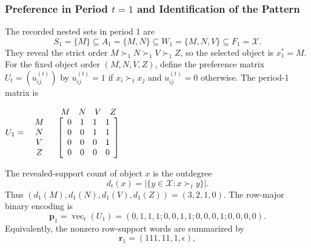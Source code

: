 \documentclass[conference]{IEEEtran}
\theoremstyle{plain}
\theoremstyle{definition}
\theoremstyle{remark}
\begin{document}
	\subsubsection{Preference in Period \texorpdfstring{$ t=1$}{t=1} and Identification of the Pattern}
	The recorded nested sets in period 1 are
	\begin{equation}
		S_1=\{M\}\subseteq A_1=\{M,N\}
		\subseteq W_1=\{M,N,V\}
		\subseteq F_1=\mathcal X.
	\end{equation}
	They reveal the strict order $M\succ_1 N\succ_1 V\succ_1 Z$, so the selected object is $x_1^*=M$. For the fixed object order $(M,N,V,Z)$, define the preference matrix $U_t=(u_{ij}^{(t)})$ by $u_{ij}^{(t)}=1$ if $x_i\succ_t x_j$ and $u_{ij}^{(t)}=0$ otherwise. The period-1 matrix is
	\begin{center}
		$U_1=
		\begin{array}{c c c c } &
			\begin{array}{c c c c} M & N & V & Z \\
			\end{array}
			\\
			\begin{array}{c c c c}
				M \\
				N\\
				V\\
				Z\\
			\end{array}
			&
			\left[
			\begin{array}{c c c c}
				0 & 1 & 1 & 1 \\
				0 & 0 & 1 & 1 \\
				0 & 0 & 0 & 1 \\
				0 & 0 & 0 & 0
			\end{array}
			\right]
		\end{array}
		$
	\end{center}
	The revealed-support count of object $x$ is the outdegree
	\begin{equation}\label{eq:support-count-preliminary}
		d_t(x)=\left|\{y\in\mathcal X:x\succ_t y\}\right|.
	\end{equation}
	Thus $(d_1(M),d_1(N),d_1(V),d_1(Z))=(3,2,1,0)$. The row-major binary encoding is
	\begin{equation}
		\mathbf p_1=\operatorname{vec}_{\mathrm r}(U_1)
		=(0,1,1,1;0,0,1,1;0,0,0,1;0,0,0,0).
	\end{equation}
	Equivalently, the nonzero row-support words are summarized by
	\begin{equation}
		\mathbf r_1=(111,11,1,\epsilon),
	\end{equation}
\end{document}
